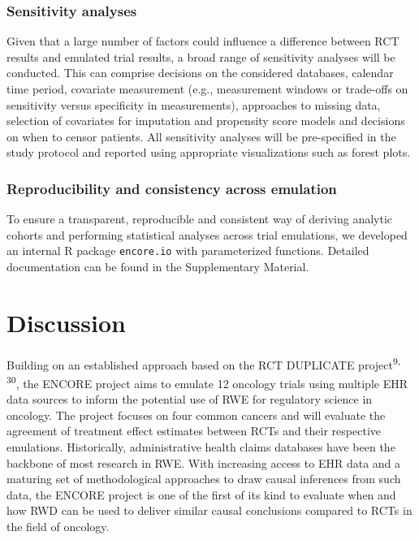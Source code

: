 \documentclass[
  letterpaper,
  DIV=11,
  numbers=noendperiod]{scrartcl}
\begin{document}
\subsubsection{Sensitivity analyses}\label{sensitivity-analyses}

Given that a large number of factors could influence a difference
between RCT results and emulated trial results, a broad range of
sensitivity analyses will be conducted. This can comprise decisions on
the considered databases, calendar time period, covariate measurement
(e.g., measurement windows or trade-offs on sensitivity versus
specificity in measurements), approaches to missing data, selection of
covariates for imputation and propensity score models and decisions on
when to censor patients. All sensitivity analyses will be pre-specified
in the study protocol and reported using appropriate visualizations such
as forest plots.

\subsubsection{Reproducibility and consistency across
emulation}\label{reproducibility-and-consistency-across-emulation}

To ensure a transparent, reproducible and consistent way of deriving
analytic cohorts and performing statistical analyses across trial
emulations, we developed an internal R package \texttt{encore.io} with
parameterized functions. Detailed documentation can be found in the
Supplementary Material.

\newpage{}

\section{Discussion}\label{discussion}

Building on an established approach based on the RCT DUPLICATE
project\textsuperscript{9, 30}, the ENCORE project aims to emulate 12
oncology trials using multiple EHR data sources to inform the potential
use of RWE for regulatory science in oncology. The project focuses on
four common cancers and will evaluate the agreement of treatment effect
estimates between RCTs and their respective emulations. Historically,
administrative health claims databases have been the backbone of most
research in RWE. With increasing access to EHR data and a maturing set
of methodological approaches to draw causal inferences from such data,
the ENCORE project is one of the first of its kind to evaluate when and
how RWD can be used to deliver similar causal conclusions compared to
RCTs in the field of oncology.
\end{document}
